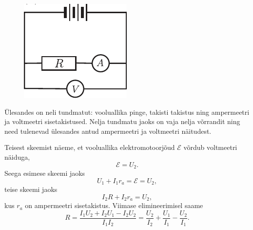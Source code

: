 \begin{figure}[h]
\begin{minipage}[b]{0.3\textwidth}
		\includegraphics[width=\linewidth]{2005-v2g-04-yl2}
    \end{minipage}
\end{figure}

\hint
Ülesandes on neli tundmatut: vooluallika pinge, takisti takistus ning ampermeetri ja voltmeetri sisetakistused. Nelja tundmatu jaoks on vaja nelja võrrandit ning need tulenevad ülesandes antud ampermeetri ja voltmeetri näitudest.

\solu
Teisest skeemist näeme, et vooluallika elektromotoorjõud $\mathcal E$ võrdub voltmeetri näiduga,
\[
\mathcal E = U_2.
\]
Seega esimese skeemi jaoks
\[
U_1 + I_1r_a = \mathcal E = U_2,
\]
teise skeemi jaoks
\[
I_2R + I_2r_a = U_2,
\]
kus $r_a$ on ampermeetri sisetakistus. Viimase elimineerimisel saame
\[
R=\frac{I_{1} U_{2}+I_{2} U_{1}-I_{2} U_{2}}{I_{1} I_{2}}=\frac{U_{2}}{I_{2}}+\frac{U_{1}}{I_{1}}-\frac{U_{2}}{I_{1}}.
\]
\probend